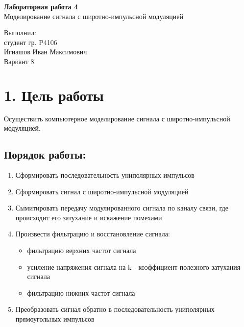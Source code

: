 \documentclass[12pt]{article}
\begin{document}



\begin{center}
	\LARGE 
	\textbf{Лабораторная работа 4}\\
	Моделирование сигнала с широтно-импульсной модуляцией
	\\[3\baselineskip]
\end{center}

\begin{flushright}
	\large
	Выполнил:\\
	студент гр. P4106\\
	Игнашов Иван Максимович\\
	Вариант 8\\
\end{flushright}

\newpage

 \section*{1. Цель работы}
Осуществить компьютерное моделирование сигнала с широтно-импульсной модуляцией.

\subsection*{Порядок работы:}
\begin{enumerate}
	\item Сформировать последовательность униполярных импульсов
	\item Сформировать сигнал с широтно-импульсной модуляцией
	\item Сымитировать передачу модулированного сигнала по каналу связи, где происходит его затухание и искажение помехами
	\item Произвести фильтрацию и восстановление сигнала:
		\begin{itemize}
			\item фильтрацию верхних частот сигнала
			\item усиление напряжения сигнала на k - коэффициент полезного затухания сигнала
			\item фильтрацию нижних частот сигнала
		\end{itemize}
	\item Преобразовать сигнал обратно в последовательность униполярных прямоугольных импульсов

\end{enumerate}
\end{document}

